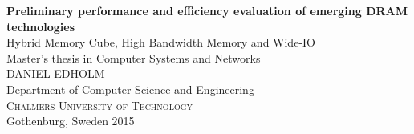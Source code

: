 
\begin{titlepage}
			
\addtolength{\voffset}{2cm}


\mbox{}
\vfill
\renewcommand{\familydefault}{\sfdefault} \normalfont %
\textbf{{\Huge 	Preliminary performance and efficiency evaluation of emerging DRAM technologies}} 	\\[0.5cm]
{\Large Hybrid Memory Cube, High Bandwidth Memory and Wide-IO }\\[0.5cm]
Master's thesis in Computer Systems and Networks \\[0.5cm]

{\Large DANIEL EDHOLM}\\[2.5cm]

Department of Computer Science and Engineering \\
\textsc{Chalmers University of Technology} \\
Gothenburg, Sweden 2015

\renewcommand{\familydefault}{\rmdefault} \normalfont %
\end{titlepage}


\newpage
\restoregeometry
\thispagestyle{empty}
\mbox{}


